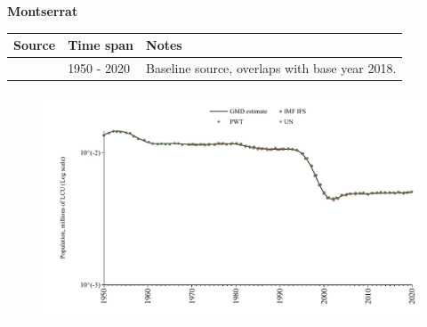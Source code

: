 \documentclass[12pt,a4paper,landscape]{article}
\begin{document}
\begin{adjustbox}{max totalsize={\paperwidth}{\paperheight},center}
\begin{minipage}[t][\textheight][t]{\textwidth}
\vspace*{0.5cm}
{}
\begin{center}
{\Large\bfseries Montserrat}
\end{center}
\vspace{0.5cm}
\begin{table}[H]
\centering
\small
\begin{tabular}{|l|l|l|}
\hline
\textbf{Source} & \textbf{Time span} & \textbf{Notes} \\
\hline
\rowcolor{white}\cite{IMF_IFS}& 1950 - 2020 &Baseline source, overlaps with base year 2018.\\
\hline
\end{tabular}
\end{table}
\begin{figure}[H]
\centering
\includegraphics[width=\textwidth,height=0.6\textheight,keepaspectratio]{graphs/MSR_pop.pdf}
\end{figure}
\end{minipage}
\end{adjustbox}
\end{document}
